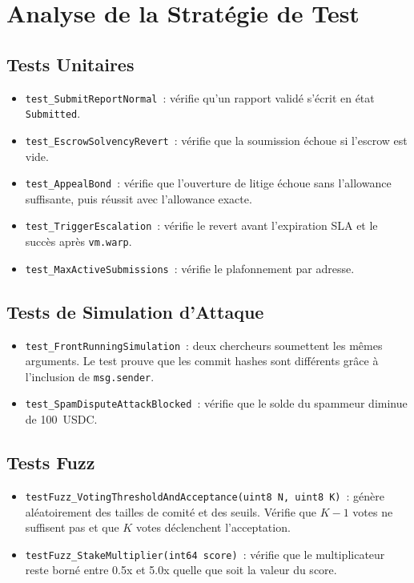 \documentclass[12pt, a4paper]{report}
\begin{document}
\chapter{Analyse de la Strat\'{e}gie de Test}

\section{Tests Unitaires}
\begin{itemize}
    \item \texttt{test\_SubmitReportNormal}~: v\'{e}rifie qu'un rapport valid\'{e} s'\'{e}crit en \'{e}tat \texttt{Submitted}.
    \item \texttt{test\_EscrowSolvencyRevert}~: v\'{e}rifie que la soumission \'{e}choue si l'escrow est vide.
    \item \texttt{test\_AppealBond}~: v\'{e}rifie que l'ouverture de litige \'{e}choue sans l'allowance suffisante, puis r\'{e}ussit avec l'allowance exacte.
    \item \texttt{test\_TriggerEscalation}~: v\'{e}rifie le revert avant l'expiration SLA et le succ\`{e}s apr\`{e}s \texttt{vm.warp}.
    \item \texttt{test\_MaxActiveSubmissions}~: v\'{e}rifie le plafonnement par adresse.
\end{itemize}

\section{Tests de Simulation d'Attaque}
\begin{itemize}
    \item \texttt{test\_FrontRunningSimulation}~: deux chercheurs soumettent les m\^{e}mes arguments. Le test prouve que les commit hashes sont diff\'{e}rents gr\^{a}ce \`{a} l'inclusion de \texttt{msg.sender}.
    \item \texttt{test\_SpamDisputeAttackBlocked}~: v\'{e}rifie que le solde du spammeur diminue de 100~USDC.
\end{itemize}

\section{Tests Fuzz}
\begin{itemize}
    \item \texttt{testFuzz\_VotingThresholdAndAcceptance(uint8 N, uint8 K)}~: g\'{e}n\`{e}re al\'{e}atoirement des tailles de comit\'{e} et des seuils. V\'{e}rifie que $K-1$ votes ne suffisent pas et que $K$ votes d\'{e}clenchent l'acceptation.
    \item \texttt{testFuzz\_StakeMultiplier(int64 score)}~: v\'{e}rifie que le multiplicateur reste born\'{e} entre 0.5x et 5.0x quelle que soit la valeur du score.
\end{itemize}
\end{document}
